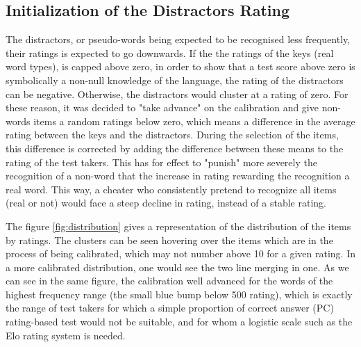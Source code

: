 \subsection{Initialization of the Distractors Rating}
The distractors, or pseudo-words being expected to be recognised less frequently, their ratings is expected to go downwards. If the the ratings of the keys (real word types), is capped above zero, in order to show that a test score above zero is symbolically a non-null knowledge of the language, the rating of the distractors can be negative. Otherwise, the distractors would cluster at a rating of zero. For these reason, it was decided to "take advance" on the calibration and give non-words items a random ratings below zero, which means a difference in the average rating between the keys and the distractors. During the selection of the items, this difference is corrected by adding the difference between these means to the rating of the test takers. This has for effect to "punish" more severely the recognition of a non-word that the increase in rating rewarding the recognition a real word. This way, a cheater who consistently pretend to recognize all items (real or not) would face a steep decline in rating, instead of a stable rating.

The figure \ref{fig:distribution} gives a representation of the distribution of the items by ratings. The clusters can be seen hovering over the items which are in the process of being calibrated, which may not number above 10 for a given rating. In a more calibrated distribution, one would see the two line merging in one. As we can see in the same figure, the calibration well advanced for the words of the highest frequency range (the small blue bump below 500 rating), which is exactly the range of test takers for which a simple proportion of correct answer (PC) rating-based test would not be suitable, and for whom a logistic scale such as the Elo rating system is needed.

